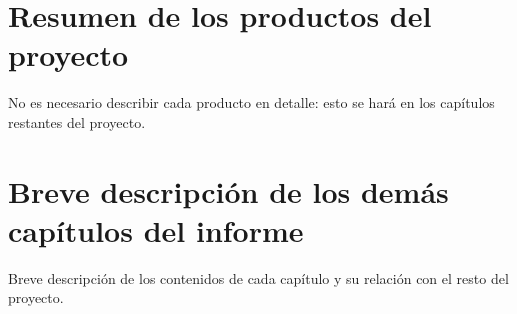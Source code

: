 \section{Resumen de los productos del proyecto}

No es necesario describir cada producto en detalle: esto se hará en los capítulos restantes del proyecto.

\section{Breve descripción de los demás capítulos del informe}

Breve descripción de los contenidos de cada capítulo y su relación con el resto del proyecto.